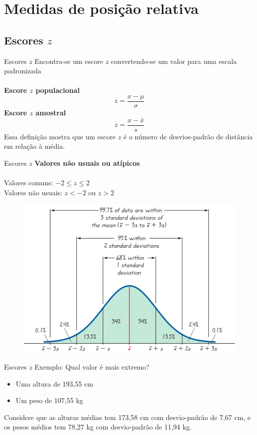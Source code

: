 \documentclass[10pt]{beamer}\usepackage[]{graphicx}\usepackage[]{color}
\theoremstyle{definition}
\begin{document}
\section[Medidas de posição]{Medidas de posição relativa}

\subsection{Escores $z$}

\begin{frame}{Escores $z$}
  Encontra-se um escore $z$ convertendo-se um valor para uma escala
  padronizada\\~\\
  \textbf{Escore $z$ populacional}
  \begin{equation*}
    z = \frac{x - \mu}{\sigma}
  \end{equation*}
    \textbf{Escore $z$ amostral}
  \begin{equation*}
    z = \frac{x - \bar{x}}{s}
  \end{equation*}
  Essa definição mostra que um escore $z$ é o número de desvios-padrão
  de distância em relação à média.
\end{frame}

\begin{frame}{Escores $z$}
  \textbf{Valores não usuais ou atípicos}\\~\\
  Valores comuns: $-2 \leq z \leq 2$\\
  Valores não usuais: $z< -2$ ou $z>2$
  \begin{figure}[h]
    \centering
    \includegraphics[width=.7\textwidth]{../img/empirica}
  \end{figure}
\end{frame}

\begin{frame}{Escores $z$}
  Exemplo: Qual valor é mais extremo?
  \begin{itemize}
  \item Uma altura de 193,55 cm
  \item Um peso de 107,55 kg
  \end{itemize}
  Considere que as alturas médias tem 173,58 cm com desvio-padrão de
  7,67 cm, e os pesos médios tem 78,27 kg com desvio-padrão de 11,94
  kg.
\end{frame}
\end{document}
